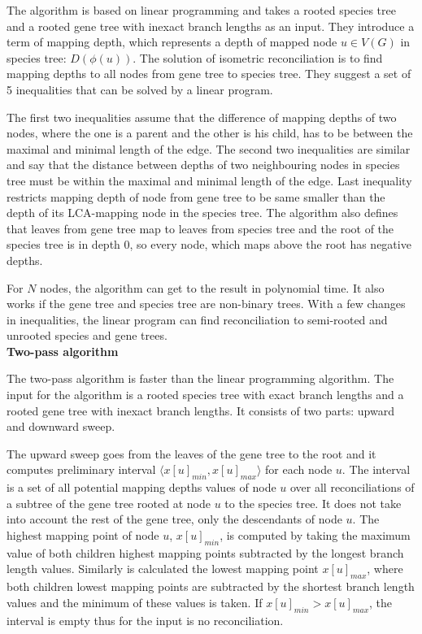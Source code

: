 The algorithm is based on linear programming and takes a rooted species tree and a rooted gene tree with inexact branch lengths as an input. They introduce a term of mapping depth, which represents a depth of mapped node $u \in V(G)$ in species tree: $D(\phi(u))$. The solution of isometric reconciliation is to find mapping depths to all nodes from gene tree to species tree. They suggest a set of 5 inequalities that can be solved by a linear program.

The first two inequalities assume that the difference of mapping depths of two nodes, where the one is a parent and the other is his child, has to be between the maximal and minimal length of the edge. The second two inequalities are similar and say that the distance between depths of two neighbouring nodes in species tree must be within the maximal and minimal length of the edge. Last inequality restricts mapping depth of node from gene tree to be same smaller than the depth of its LCA-mapping node in the species tree. The algorithm also defines that leaves from gene tree map to leaves from species tree and the root of the species tree is in depth 0, so every node, which maps above the root has negative depths. 

For $N$ nodes, the algorithm can get to the result in polynomial time. It also works if the gene tree and species tree are non-binary trees. With a few changes in inequalities, the linear program can find reconciliation to semi-rooted and unrooted species and gene trees.\\
\textbf{Two-pass algorithm} \label{two-pass_algorithm}

The two-pass algorithm is faster than the linear programming algorithm. The input for the algorithm is a rooted species tree with exact branch lengths and a rooted gene tree with inexact branch lengths. It consists of two parts: upward and downward sweep. 

The upward sweep goes from the leaves of the gene tree to the root and it computes preliminary interval $\langle x[u]_{min}, x[u]_{max} \rangle$ for each node $u$. The interval is a set of all potential mapping depths values of node $u$ over all reconciliations of a subtree of the gene tree rooted at node $u$ to the species tree. It does not take into account the rest of the gene tree, only the descendants of node $u$. The highest mapping point of node $u$, $x[u]_{min}$, is computed by taking the maximum value of both children highest mapping points subtracted by the longest branch length values. Similarly is calculated the lowest mapping point $x[u]_{max}$, where both children lowest mapping points are subtracted by the shortest branch length values and the minimum of these values is taken. If $x[u]_{min} > x[u]_{max}$, the interval is empty thus for the input is no reconciliation.

